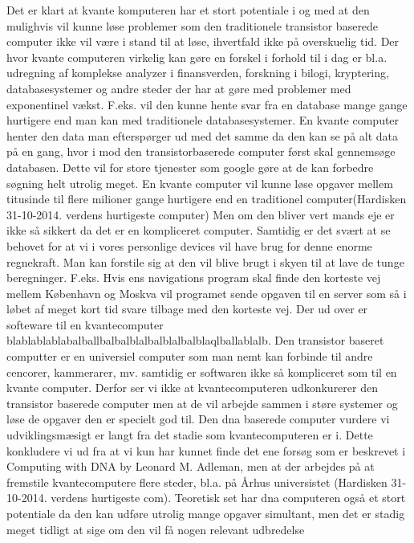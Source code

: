 \documentclass[12pt]{article}
\begin{document}
\begin{enumerate}
Det er klart at kvante komputeren har et stort potentiale i og med at den
mulighvis vil kunne løse problemer som den traditionele transistor baserede
computer ikke vil være i stand til at løse, ihvertfald ikke på overskuelig tid.
Der hvor kvante computeren virkelig kan gøre en forskel i forhold til i dag er
bl.a. udregning af komplekse analyzer i finansverden, forskning i bilogi,
kryptering, databasesystemer og andre  steder der har at gøre med problemer med
exponentinel vækst. F.eks. vil den kunne hente svar fra en database mange gange
hurtigere end man kan med traditionele databasesystemer. En kvante computer
henter den data man efterspørger ud med det samme da den kan se på alt data på
en gang, hvor i mod den transistorbaserede computer først skal gennemsøge
databasen. Dette vil for store tjenester som google gøre at de kan forbedre
søgning helt utrolig meget. En kvante computer vil kunne løse opgaver mellem
titusinde til flere milioner gange hurtigere end en traditionel
computer(Hardisken 31-10-2014. verdens hurtigeste computer)
Men om den bliver vert mands eje er ikke så sikkert da det er en kompliceret
computer. Samtidig er det svært at se behovet for at vi i vores personlige
devices vil have brug for denne enorme regnekraft. Man kan forstile sig at den
vil blive brugt i skyen til at lave de tunge beregninger. F.eks. Hvis ens
navigations program skal finde den korteste vej mellem København og Moskva 
vil programet sende opgaven til en server som så i løbet af meget kort tid
svare tilbage med den korteste vej. Der ud over er softeware til en
kvantecomputer blablablablabalballbalbalblalbalblalbalblaqlballablalb. Den
transistor baseret computter er en universiel computer som man nemt kan
forbinde til andre cencorer, kammerarer, mv. samtidig er softwaren ikke så
kompliceret som til en kvante computer. Derfor ser vi
ikke at kvantecomputeren udkonkurerer den transistor baserede computer men at de
vil arbejde sammen i støre systemer og løse de opgaver den er specielt god til.
Den dna baserede computer vurdere vi udviklingsmæsigt er langt fra det stadie
som kvantecomputeren er i. Dette konkludere vi ud fra at vi kun har kunnet finde
det ene forsøg som er beskrevet i Computing with DNA by Leonard M. Adleman, men
at der arbejdes på at fremstile kvantecomputere flere steder, bl.a. på Århus
universistet (Hardisken 31-10-2014. verdens hurtigeste com). Teoretisk set
har dna computeren også et stort potentiale da den kan udføre utrolig mange
opgaver simultant, men det er stadig meget tidligt at sige om den vil få nogen
relevant udbredelse
 
\end{enumerate}
\end{document}
